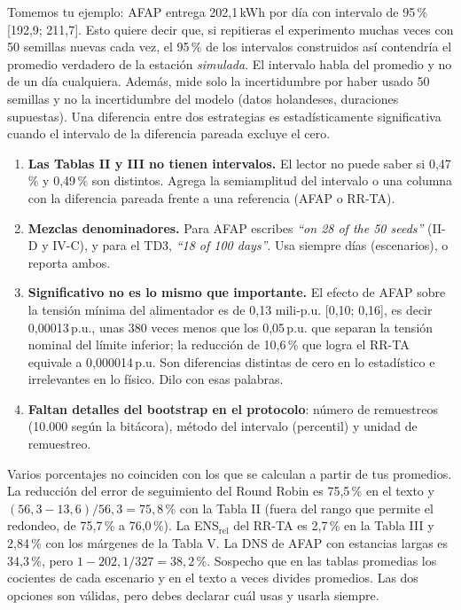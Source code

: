 \documentclass[11pt]{article}
\begin{document}
\begin{idea}
Tomemos tu ejemplo: AFAP entrega 202,1\,kWh por día con intervalo de 95\,\% [192,9; 211,7]. Esto quiere decir que, si repitieras el experimento muchas veces con 50 semillas nuevas cada vez, el 95\,\% de los intervalos construidos así contendría el promedio verdadero de la estación \emph{simulada}. El intervalo habla del promedio y no de un día cualquiera. Además, mide solo la incertidumbre por haber usado 50 semillas y no la incertidumbre del modelo (datos holandeses, duraciones supuestas). Una diferencia entre dos estrategias es estadísticamente significativa cuando el intervalo de la diferencia pareada excluye el cero.
\end{idea}

\begin{error}
\begin{enumerate}[leftmargin=1.5em]
\item \textbf{Las Tablas II y III no tienen intervalos.} El lector no puede saber si 0,47\,\% y 0,49\,\% son distintos. Agrega la semiamplitud del intervalo o una columna con la diferencia pareada frente a una referencia (AFAP o RR-TA).
\item \textbf{Mezclas denominadores.} Para AFAP escribes \foreignlanguage{english}{\emph{``on 28 of the 50 seeds''}} (II-D y IV-C), y para el TD3, \foreignlanguage{english}{\emph{``18 of 100 days''}}. Usa siempre días (escenarios), o reporta ambos.
\item \textbf{Significativo no es lo mismo que importante.} El efecto de AFAP sobre la tensión mínima del alimentador es de 0,13 mili-p.u. [0,10; 0,16], es decir 0,00013\,p.u., unas 380 veces menos que los 0,05\,p.u. que separan la tensión nominal del límite inferior; la reducción de 10,6\,\% que logra el RR-TA equivale a 0,000014\,p.u. Son diferencias distintas de cero en lo estadístico e irrelevantes en lo físico. Dilo con esas palabras.
\item \textbf{Faltan detalles del bootstrap en el protocolo}: número de remuestreos (10.000 según la bitácora), método del intervalo (percentil) y unidad de remuestreo.
\end{enumerate}
\end{error}

\begin{duda}
Varios porcentajes no coinciden con los que se calculan a partir de tus promedios. La reducción del error de seguimiento del Round Robin es 75,5\,\% en el texto y $(56{,}3-13{,}6)/56{,}3 = 75{,}8$\,\% con la Tabla II (fuera del rango que permite el redondeo, de 75,7\,\% a 76,0\,\%). La ENS$_{\mathrm{rel}}$ del RR-TA es 2,7\,\% en la Tabla III y 2,84\,\% con los márgenes de la Tabla V. La DNS de AFAP con estancias largas es 34,3\,\%, pero $1 - 202{,}1/327 = 38{,}2$\,\%. Sospecho que en las tablas promedias los cocientes de cada escenario y en el texto a veces divides promedios. Las dos opciones son válidas, pero debes declarar cuál usas y usarla siempre.
\end{duda}
\end{document}
